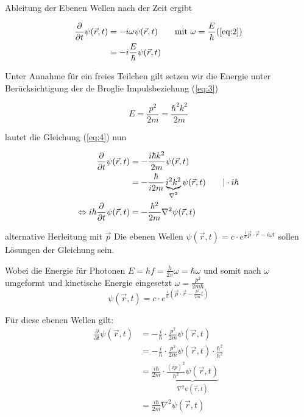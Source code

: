 Ableitung der Ebenen Wellen nach der Zeit ergibt

\begin{align}
  \label{eq:4}
   \frac{\partial}{\partial t}\psi(\vec{r},t) &= -i \omega \psi(\vec{r},t) \qquad \text{mit } \omega=\frac{E}{\hbar} (\ref{eq:2}) \\
&= -i \frac{E}{\hbar} \psi(\vec{r},t) \\
\end{align}

Unter Annahme für ein freies Teilchen gilt setzen wir die Energie unter Berücksichtigung der de Broglie Impulsbeziehung (\ref{eq:3})

\begin{equation}
  \label{eq:6}
  E=\frac{p^2}{2m}=\frac{\hbar^2k^2}{2m}
\end{equation}


lautet die Gleichung (\ref{eq:4}) nun

\begin{align}
  \label{eq:7}
  \frac{\partial}{\partial t}\psi(\vec{r},t) &=-\frac{i\hbar k^2}{2m}  \psi(\vec{r},t) \\
 &=-\frac{\hbar}{i2m} \underbr{i^2k^2}_{\nabla^2} \psi(\vec{r},t) \qquad |\cdot i\hbar\\
\Leftrightarrow i\hbar  \frac{\partial}{\partial t}\psi(\vec{r},t) &= -\frac{\hbar^2}{2m} \nabla^2\psi(\vec{r},t)
\end{align}




alternative Herleitung mit \(\vec p\)
Die ebenen Wellen \(\psi(\vec{r},t)=c\cdot  e^{\frac{i}{\hbar}\vec{p}\cdot\vec{r}-i\omega t}\) sollen  Lösungen der Gleichung sein. 

Wobei die Energie für Photonen \(E=hf=\frac{h}{2\pi}\omega=\hbar\omega\) und somit nach \(\omega\) umgeformt und kinetische Energie eingesetzt \(\omega = \frac{p^2}{2m\hbar}\)  \\

  \begin{equation}
    \label{eq:1}
    \psi(\vec{r},t)=c\cdot  e^{\frac{i}{\hbar}(\vec{p}\cdot\vec{r}-\frac{p^{2}}{2m}t)}
  \end{equation}

  Für diese ebenen Wellen gilt:
  \begin{align*}
    \frac{\partial}{\partial t}\psi(\vec{r},t) &=
      -\frac{i}{\hbar}\cdot\frac{p^{2}}{2m}\psi(\vec{r},t)\\
      &=-\frac{i}{\hbar}\cdot\frac{p^{2}}{2m}\psi(\vec{r},t)
      \cdot \frac{\hbar^2}{\hbar^2}\\
  &= \frac{i\hbar}{2m}\cdot  \underbrace{\frac{(ip)^2}{\hbar^2}\psi(\vec{r},t)}_{\nabla^2\psi(\vec{r},t)}\\
  &= \frac{i\hbar}{2m}\nabla^2\psi(\vec{r},t)
\end{align*}


